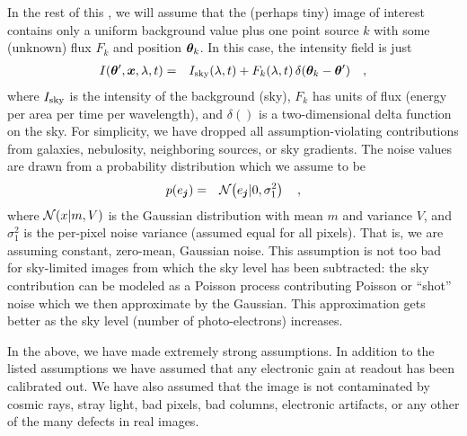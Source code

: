 In %
the rest of this \doctype, we will assume that the (perhaps tiny) image of
interest contains only a uniform background value plus one point
source $k$ with some (unknown) flux $F_k$ and position $\boldsymbol{\theta}_k$.
In this case, the intensity field is just
\begin{eqnarray}\displaystyle
I(\boldsymbol{\theta}',\boldsymbol{x},\lambda,t) &=& I_{\mathrm{sky}}(\lambda, t) + F_k(\lambda, t)\,\delta(\boldsymbol{\theta}_k - \boldsymbol{\theta}')
\quad,
\label{eqn:intensity}
\end{eqnarray}
where $I_{\mathrm{sky}}$ is the intensity of the background (sky), $F_k$ has
units of flux (energy per area per time per wavelength), and
$\delta()$ is a two-dimensional delta function on the sky.  For
simplicity, we have dropped all assumption-violating contributions
from galaxies, nebulosity, neighboring sources, or sky gradients.  The
noise values are drawn from a probability distribution which we assume
to be
\begin{eqnarray}\displaystyle
p(e_{\boldsymbol{j}}) &=& \mathcal{N}\!\left(e_{\boldsymbol{j}}|0,\sigma_1^2\right)
\quad,
\end{eqnarray}
where $\mathcal{N}\!\left(x|m,V\right)$ is the Gaussian distribution with mean $m$
and variance $V$, and $\sigma_1^2$ is the per-pixel noise variance
(assumed equal for all pixels).  That is, we are assuming constant,
zero-mean, Gaussian noise.  This assumption is not too bad for
sky-limited images from which the sky level has been subtracted: the
sky contribution can be modeled as a Poisson process contributing
Poisson or ``shot'' noise which we then approximate by the Gaussian.
This approximation gets better as the sky level (number of
photo-electrons) increases.

In the above, we have made extremely strong assumptions.  In addition
to the listed assumptions we have assumed that any electronic gain at
readout has been calibrated out.  We have also assumed that the image
is not contaminated by cosmic rays, stray light, bad pixels, bad
columns, electronic artifacts, or any other of the many defects in
real images.
